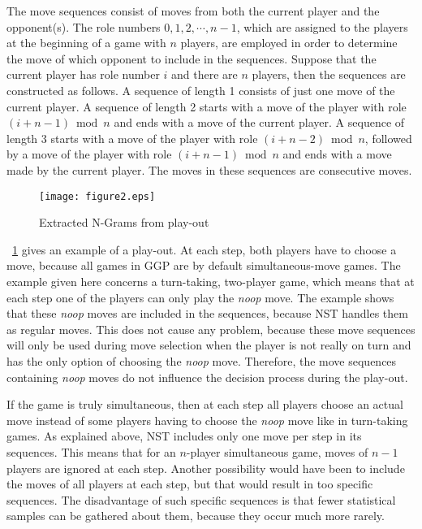 \documentclass[journal]{IEEEtran}
\begin{document}
The move sequences consist of moves from both the current player and the opponent(s). The role numbers $0, 1, 2, \cdots, n-1$, which are assigned to the players at the beginning of a game with $n$ players, are employed in order to determine the move of which opponent to include in the sequences. Suppose that the current player has role number $i$ and there are $n$ players, then the sequences are constructed as follows. A sequence of length 1 consists of just one move of the current player. A sequence of length 2 starts with a move of the player with role $\left(i+n-1 \right) \bmod{n}$ and ends with a move of the current player. A sequence of length 3 starts with a move of the player with role $\left(i+n-2 \right) \bmod{n}$, followed by a move of the player with role $\left(i+n-1 \right) \bmod{n}$ and ends with a move made by the current player. The moves in these sequences are consecutive moves.

\begin{figure}[h!]
\centering
\texttt{[image: figure2.eps]}

\caption{Extracted N-Grams from play-out}
\label{fig:tilingplayerdiagrams}
\end{figure}



\figurename~\ref{fig:tilingplayerdiagrams} gives an example of a play-out. At each step, both players have to choose a move, because all games in GGP are by default simultaneous-move games. The example given here concerns a turn-taking, two-player game, which means that at each step one of the players can only play the \textit{noop} move. The example shows that these \textit{noop} moves are included in the sequences, because NST handles them as regular moves. This does not cause any problem, because these move sequences will only be used during move selection when the player is not really on turn and has the only option of choosing the \textit{noop} move. Therefore, the move sequences containing \textit{noop} moves do not influence the decision process during the play-out.

If the game is truly simultaneous, then at each step all players choose an actual move instead of some players having to choose the \textit{noop} move like in turn-taking games. As explained above, NST includes only one move per step in its sequences. This means that for an $n$-player simultaneous game, moves of $n-1$ players are ignored at each step. Another possibility would have been to include the moves of all players at each step, but that would result in too specific sequences. The disadvantage of such specific sequences is that fewer statistical samples can be gathered about them, because they occur much more rarely.
\end{document}
